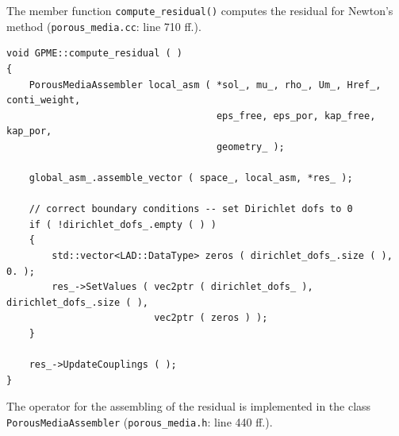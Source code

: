 \documentclass{article}
\begin{document}
The member function \texttt{compute\_residual()} computes the residual for Newton's method
(\texttt{porous\_media.cc}: line 710 ff.).

\begin{lstlisting}[firstnumber=710]
void GPME::compute_residual ( )
{
    PorousMediaAssembler local_asm ( *sol_, mu_, rho_, Um_, Href_, conti_weight,
                                     eps_free, eps_por, kap_free, kap_por,
                                     geometry_ );

    global_asm_.assemble_vector ( space_, local_asm, *res_ );

    // correct boundary conditions -- set Dirichlet dofs to 0
    if ( !dirichlet_dofs_.empty ( ) )
    {
        std::vector<LAD::DataType> zeros ( dirichlet_dofs_.size ( ), 0. );
        res_->SetValues ( vec2ptr ( dirichlet_dofs_ ), dirichlet_dofs_.size ( ),
                          vec2ptr ( zeros ) );
    }

    res_->UpdateCouplings ( );
}
\end{lstlisting}
\vspace*{15pt}
The operator for the assembling of the residual is implemented in the class \texttt{PorousMediaAssembler} (\texttt{porous\_media.h}: line 440 ff.).
\end{document}
